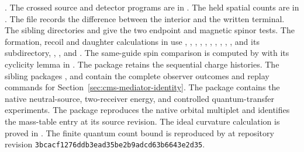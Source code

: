 \documentclass[11pt]{article}
\begin{document}
.
The crossed source and detector programs are in
. The held spatial counts are in
. The file  records
the difference between the interior and the written terminal. The
sibling directories  and 
give the two endpoint and magnetic spinor tests.
The formation, recoil and daughter calculations in
use , , ,
, , ,
, , ,
,  and its 
subdirectory, ,
,  and .
The same-guide spin comparison is computed by 
with its cyclicity lemma in .
The  package retains the sequential
charge histories. The sibling packages ,
 and  contain the complete
observer outcomes and replay commands for Section~\ref{sec:cms-mediator-identity}.
The  package contains the native neutral-source,
two-receiver energy, and controlled quantum-transfer experiments.
The  package reproduces the native
orbital multiplet and identifies the mass-table entry at its source revision.
The ideal curvature calculation is proved in .
The finite quantum count bound is reproduced by
 at repository revision
\texttt{3bcacf1276ddb3ead35be2b9adcd63b6643e2d35}.
\end{document}
